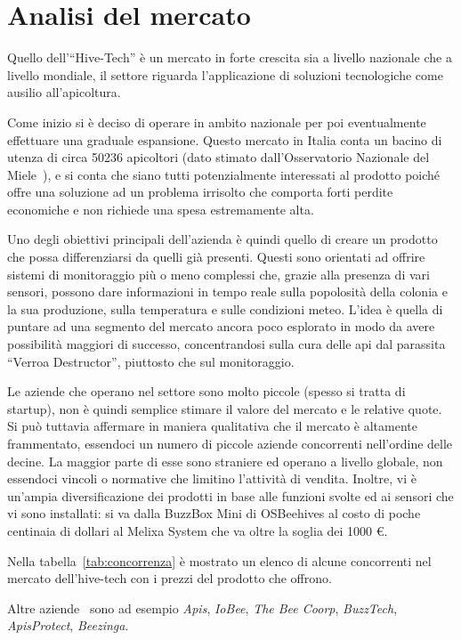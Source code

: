 \section{Analisi del mercato}
Quello dell'``Hive-Tech'' è un mercato in forte crescita sia a livello nazionale
che a livello mondiale, il settore riguarda l’applicazione di soluzioni
tecnologiche come ausilio all’apicoltura.

Come inizio si è deciso di operare in ambito nazionale per poi eventualmente
effettuare una graduale espansione. Questo mercato in Italia conta un bacino di
utenza di circa 50236 apicoltori (dato stimato dall’Osservatorio Nazionale del
Miele~\cite{miele}), e si conta che siano tutti potenzialmente interessati al
prodotto poiché offre una soluzione ad un problema irrisolto che comporta forti
perdite economiche e non richiede una spesa estremamente alta.

Uno degli obiettivi principali dell’azienda è quindi quello di creare un
prodotto che possa differenziarsi da quelli già presenti. Questi sono orientati
ad offrire sistemi di monitoraggio più o meno complessi che, grazie alla
presenza di vari sensori, possono dare informazioni in tempo reale sulla
popolosità della colonia e la sua produzione, sulla temperatura e sulle
condizioni meteo. L’idea è quella di puntare ad una segmento del mercato ancora
poco esplorato in modo da avere possibilità maggiori di successo, concentrandosi
sulla cura delle api dal parassita “Verroa Destructor”, piuttosto che sul
monitoraggio.

Le aziende che operano nel settore sono molto piccole (spesso si tratta di
startup), non è quindi semplice stimare il valore del mercato e le relative
quote. Si può tuttavia affermare in maniera qualitativa che il mercato è
altamente frammentato, essendoci un numero di piccole  aziende concorrenti
nell’ordine delle decine. La maggior parte di esse sono straniere ed operano a
livello globale, non essendoci vincoli o normative che limitino l’attività di
vendita. Inoltre, vi è un’ampia diversificazione dei prodotti in base alle
funzioni svolte ed ai sensori che vi sono installati: si va dalla BuzzBox Mini
di OSBeehives al costo di poche centinaia di dollari al Melixa System che va
oltre la soglia dei 1000 \euro.

Nella tabella~\ref{tab:concorrenza} è mostrato un elenco di alcune concorrenti
nel mercato dell’hive-tech con i prezzi del prodotto che offrono.

Altre aziende~\cite{concorrenza} sono ad esempio \emph{Apis}, \emph{IoBee}, 
\emph{The Bee Coorp}, \emph{BuzzTech}, \emph{ApisProtect}, \emph{Beezinga}.      
